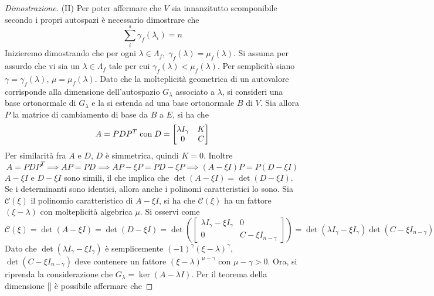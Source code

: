 \begin{proof}[Dimostrazione]
        \vspace{10pt}
        (II) Per poter affermare che $V$ sia innanzitutto scomponibile secondo i propri autospazi è necessario dimostrare che
        \[
            \sum_{i}^{s} \gamma_f(\lambda_i) = n
        \]
        Inizieremo dimostrando che per ogni $\lambda \in \Lambda_{f}, \; \gamma_{f}(\lambda) = \mu_{f}(\lambda)$. Si assuma per assurdo che vi sia un $\lambda \in \Lambda_{f}$ tale per cui $\gamma_{f}(\lambda) < \mu_{f}(\lambda)$. Per semplicità siano $\gamma = \gamma_{f}(\lambda)$, $\mu = \mu_{f}(\lambda)$. Dato che la molteplicità geometrica di un autovalore corrisponde alla
        dimensione dell'autospazio $G_{\lambda}$ associato a $\lambda$, si consideri una base ortonormale di $G_{\lambda}$ e la si estenda ad una base ortonormale $B$ di $V$. Sia allora $P$ la matrice di cambiamento di base da $B$ a $E$, si ha che
        \[
            A = PDP^{T} \; \textnormal{con} \; D = \begin{bmatrix}
                \lambda I_{\gamma} & K \\
                0 & C
            \end{bmatrix}
        \]
        Per similarità fra $A$ e $D$, $D$ è simmetrica, quindi $K = 0$. Inoltre
        \[
            A = PDP^{T} \implies AP = PD \implies AP - \xi P = PD - \xi P \implies (A - \xi I) P = P (D - \xi I)
        \]
        $A - \xi I$ e $D - \xi I$ sono simili, il che implica che $\det(A - \xi I) = \det(D - \xi I)$. Se i determinanti sono identici, allora anche i polinomi caratteristici lo sono. Sia $\mathcal{C}(\xi)$ il polinomio caratteristico di $A - \xi I$, si ha che
        $\mathcal{C}(\xi)$ ha un fattore $(\xi - \lambda)$ con molteplicità algebrica $\mu$. Si osservi come
        \[
            \mathcal{C}(\xi) = \det(A - \xi I) = \det(D - \xi I) = \det\left(\begin{bmatrix}
                \lambda I_{\gamma} - \xi I_{\gamma} & 0 \\
                0 & C - \xi I_{n - \gamma}
            \end{bmatrix}\right) =
            \det(\lambda I_{\gamma} - \xi I_{\gamma})\det(C - \xi I_{n - \gamma})
        \]
        Dato che $\det(\lambda I_{\gamma} - \xi I_{\gamma})$ è semplicemente $(-1)^{\gamma}(\xi - \lambda)^{\gamma}$, $\det(C - \xi I_{n - \gamma})$ deve contenere un fattore $(\xi - \lambda)^{\mu - \gamma}$ con $\mu - \gamma > 0$.
        Ora, si riprenda la considerazione che $G_{\lambda} = \ker(A - \lambda I)$. Per il teorema della dimensione [] è possibile affermare che

\end{proof}
